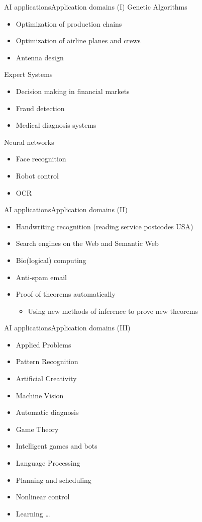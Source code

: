 \documentclass[10pt,compress]{beamer} %
\begin{document}
\begin{frame}{AI applications}{Application domains (I)}
	Genetic Algorithms
	\begin{itemize}
		\item Optimization of production chains
		\item Optimization of airline planes and crews
		\item Antenna design
	\end{itemize}
	Expert Systems
	\begin{itemize}
		\item Decision making in financial markets
		\item Fraud detection
		\item Medical diagnosis systems
	\end{itemize}
	Neural networks
	\begin{itemize}
		\item Face recognition
		\item Robot control
		\item OCR
	\end{itemize}
\end{frame}

\begin{frame}{AI applications}{Application domains (II)}
	\begin{itemize}
		\item Handwriting recognition (reading service postcodes USA) 
		\item Search engines on the Web and Semantic Web 
		\item Bio(logical) computing 
		\item Anti-spam email 
		\item Proof of theorems automatically 
			\begin{itemize}
			\item Using new methods of inference to prove new theorems
			\end{itemize}
	\end{itemize}
\end{frame}

\begin{frame}{AI applications}{Application domains (III)}
	\begin{itemize}
		\item Applied Problems 
		\item Pattern Recognition 
		\item Artificial Creativity 
		\item Machine Vision 
		\item Automatic diagnosis 
		\item Game Theory 
		\item Intelligent games and bots 
		\item Language Processing 
		\item Planning and scheduling 
		\item Nonlinear control 
		\item Learning …
	\end{itemize}	
\end{frame}
\end{document}
